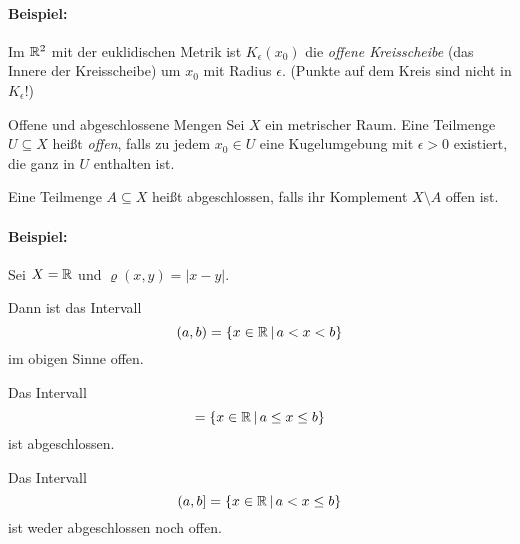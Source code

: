 \paragraph{Beispiel:} Im $\mathbb{R}^2$ mit der euklidischen Metrik ist $K_\epsilon(x_0)$ die \emph{offene Kreisscheibe} (das Innere der Kreisscheibe) um $x_0$ mit Radius $\epsilon$. (Punkte auf dem Kreis sind nicht in $K_\epsilon$!)

\begin{definition}{Offene und abgeschlossene Mengen}
	Sei $X$ ein metrischer Raum. Eine Teilmenge $U\subseteq X$ heißt \emph{offen}, falls zu jedem $x_0\in U$ eine Kugelumgebung mit $\epsilon>0$ existiert, die ganz in $U$ enthalten ist.

	Eine Teilmenge $A\subseteq X$ heißt abgeschlossen, falls ihr Komplement $X\setminus A$ offen ist.
\end{definition}
\paragraph{Beispiel:}
Sei $X=\mathbb{R}$ und $\varrho(x,y)=|x-y|$.

Dann ist das Intervall
\begin{equation*}
	(a,b)=\left\{ x\in \mathbb{R} \,\middle|\, a<x<b \right\}
\end{equation*}
im obigen Sinne offen.

Das Intervall
\begin{equation*}
	[a,b]=\set{x\in\R}{a\leq x\leq b}
\end{equation*}
ist abgeschlossen.

Das Intervall
\begin{equation*}
	(a,b]=\left\{ x\in \mathbb{R} \,\middle|\, a<x\leq b \right\}
\end{equation*}
ist weder abgeschlossen noch offen.

